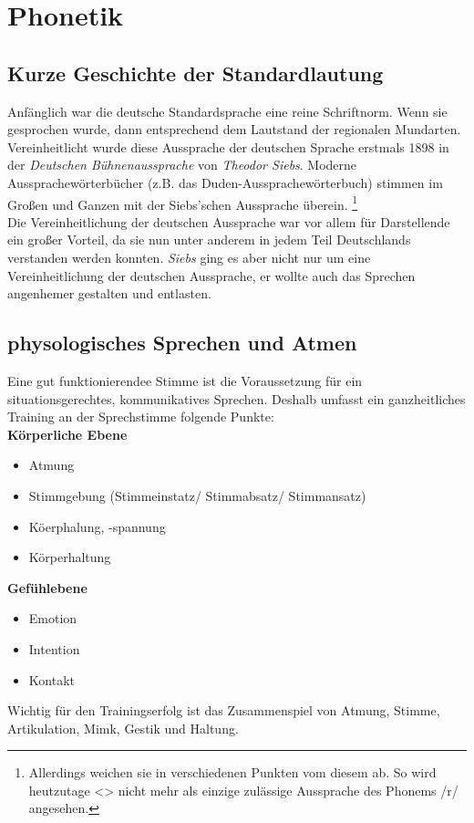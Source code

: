 \documentclass[ngerman, a4paper, twoside]{scrbook}%
\begin{document}
	\setcounter{chapter}{0}
	\setcounter{section}{0}
	\part{Phonetik}

	\chapter{Kurze Geschichte der Standardlautung}
	Anfänglich war die deutsche Standardsprache eine reine Schriftnorm. Wenn sie gesprochen wurde, dann entsprechend dem Lautstand der regionalen Mundarten.\\

	Vereinheitlicht wurde diese Aussprache der deutschen Sprache erstmals 1898 in der \emph{Deutschen Bühnenaussprache} von \emph{Theodor Siebs}. Moderne Aussprachewörterbücher (z.B. das Duden-Aussprachewörterbuch) stimmen im Großen und Ganzen mit der Siebs’schen Aussprache überein.
	\footnote{Allerdings weichen sie in verschiedenen Punkten vom diesem ab. So wird heutzutage <> nicht mehr als einzige zulässige Aussprache des Phonems /r/ angesehen.}\\

	Die Vereinheitlichung der deutschen Aussprache war vor allem für Darstellende ein großer Vorteil, da sie nun unter anderem in jedem Teil Deutschlands verstanden werden konnten. \emph{Siebs} ging es aber nicht nur um eine Vereinheitlichung der deutschen Aussprache, er wollte auch das Sprechen angenhemer gestalten und entlasten.

	\chapter{physologisches Sprechen und Atmen}
	Eine gut funktionierendee Stimme ist die Voraussetzung für ein situationsgerechtes, kommunikatives Sprechen. Deshalb umfasst ein ganzheitliches Training an der Sprechstimme folgende Punkte:\\

	\textbf{Körperliche Ebene}
	\vspace{-.2cm}
	\begin{itemize}
		\item Atmung
		\item Stimmgebung (Stimmeinstatz/ Stimmabsatz/ Stimmansatz)
		\item Köerphalung, -spannung
		\item Körperhaltung
	\end{itemize}
	\textbf{Gefühlebene}
	\vspace{-.2cm}
	\begin{itemize}
		\item Emotion
		\item Intention
		\item Kontakt
	\end{itemize}
	Wichtig für den Trainingserfolg ist das Zusammenspiel von Atmung, Stimme, Artikulation, Mimk, Gestik und Haltung.
\end{document}
